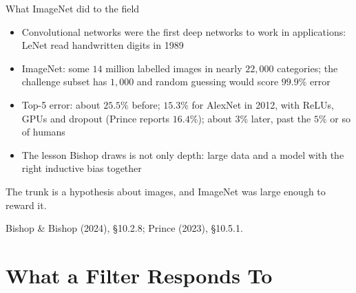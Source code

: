 \documentclass[aspectratio=169, 11pt]{beamer}
\newcommand{\srcline}[1]{%
  \par\vspace{0.25em}%
  {\scriptsize\color{mcMuted}\hfill #1\par}}
\newcommand{\src}[3]{}      %
\begin{document}
\begin{frame}{What ImageNet did to the field}
  \src{bishop2024}{section}{10.2.8}
  \src{prince2023}{section}{10.5.1}
  \vspace{0.1em}
  {\footnotesize
  \begin{itemize}\itemsep0.30em
    \item Convolutional networks were the first deep networks to work
          in applications: LeNet read handwritten digits in 1989
    \item ImageNet: some $14$ million labelled images in nearly
          $22{,}000$ categories; the challenge subset has $1{,}000$ and
          random guessing would score $99.9\%$ error
    \item Top-5 error: about $25.5\%$ before; $15.3\%$ for AlexNet in
          2012, with ReLUs, GPUs and dropout (Prince reports $16.4\%$);
          about $3\%$ later, past the $5\%$ or so of humans
    \item The lesson Bishop draws is not only depth: large data and a
          model with the \alert{right inductive bias} together
  \end{itemize}}
  \vspace{-0.1em}
  \begin{redhighlight}
    The trunk is a hypothesis about images, and ImageNet was large
    enough to reward it.
  \end{redhighlight}
  \vspace{-0.3em}
  \srcline{Bishop \& Bishop (2024), \S10.2.8; Prince (2023), \S10.5.1.}
\end{frame}

\section{What a Filter Responds To}
\end{document}
